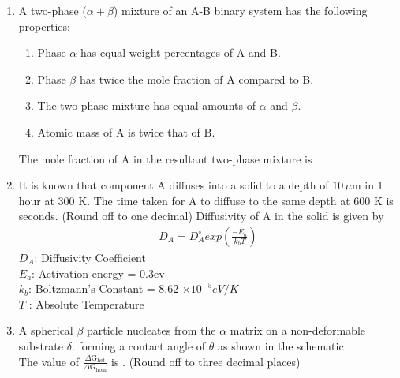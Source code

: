 \documentclass[journal,,12pt,onecolumn]{IEEEtran}
\theoremstyle{remark}
\begin{document}
\begin{enumerate}
\begin{enumerate}
\end{enumerate}
\bigskip
\item A two-phase ($\alpha + \beta$) mixture of an A-B binary system has the following properties:
\begin{enumerate}

        \item Phase $\alpha$ has equal weight percentages of A and B.
        \item Phase $\beta$ has twice the mole fraction of A compared to B.
        \item The two-phase mixture has equal amounts of $\alpha$ and $\beta$.
        \item Atomic mass of A is twice that of B.
    
\end{enumerate}
The mole fraction of A in the resultant two-phase mixture is \underline{\hspace{1cm}}
\bigskip
\item It is known that component A diffuses into a solid to a depth of $10 \, \mu$m in 1 hour at 300 K. The time taken for A to diffuse to the same depth at 600 K is \underline{\hspace{1cm}} seconds. (Round off to one decimal)
Diffusivity of A in the solid is given by 
\begin{align*}
    D_{A}=D_{A}^\circ exp(\frac{-E_{a}}{k_b T})
\end{align*}
$D_{A}$: Diffusivity Coefficient \\
$E_a$: Activation energy = 0.3ev \\
$k_b$: Boltzmann's Constant = 8.62 $\times 10^{-5} eV/K$\\
$T$ : Absolute Temperature 
\bigskip
\item A spherical $\beta$ particle nucleates from the $\alpha$ matrix on a non-deformable substrate $\delta$. forming a contact angle of $\theta$ as shown in the schematic\\
	The value of $\frac{\Delta \text{G}_{\text{het}}}{\Delta \text{G}_{\text{hom}}}$ is \underline{\hspace{1cm}}. (Round off to three decimal places)
\begin{figure}[H]
\centering
{}%


\end{figure}
\end{enumerate}
\end{document}
